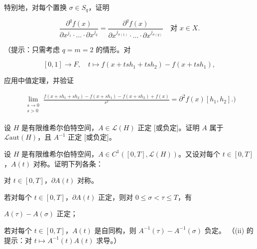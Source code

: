 \begin{exercises}
特别地，对每个置换 $ \sigma \in S_{q} $，证明

\[
\frac{\partial^{q}f(x)}{\partial x^{j_{1}} \cdot \ldots \cdot \partial x^{j_{q}}} = \frac{\partial^{q}f(x)}{\partial x^{j_{\sigma(1)}} \cdot \ldots \cdot \partial x^{j_{\sigma(q)}}} \quad \text{对 } x \in X .
\]

（提示：只需考虑 $ q = m = 2 $ 的情形。对

\[
[0, 1] \to F , \quad t \mapsto f(x + tsh_{1} + tsh_{2}) - f(x + tsh_{1}) ,
\]

应用中值定理，并验证

\begin{equation*}
\begin{aligned}
\lim_{\substack{s \to 0 \\ s > 0}}\frac{f(x + sh_{1} + sh_{2}) - f(x + sh_{1}) - f(x + sh_{2}) + f(x)}{s^{2}} = \partial^{2}f(x)[h_{1}, h_{2}] .)
\end{aligned}
\end{equation*}
\item

设 $ H $ 是有限维希尔伯特空间，$ A \in \mathcal{L}(H) $ 正定 [或负定]。证明 $ A $ 属于 $ \mathcal{L}\mathrm{aut}(H) $，且 $ A^{-1} $ 正定 [或负定]。

\item

设 $ H $ 是有限维希尔伯特空间，$ A \in C^{1}([0, T], \mathcal{L}(H)) $。又设对每个 $ t \in [0, T] $，$ A(t) $ 对称。证明下列各条：

\begin{items}
\item

对 $ t \in [0, T] $，$ \partial A(t) $ 对称。

\item

若对每个 $ t \in [0, T] $，$ \partial A(t) $ 正定，则对 $ 0 \le \sigma < \tau \le T $，有

\end{items}

\begin{subitems}
\item

$ A(\tau) - A(\sigma) $ 正定；

\item

若对每个 $ t \in [0, T] $，$ A(t) $ 是自同构，则 $ A^{-1}(\tau) - A^{-1}(\sigma) $ 负定。
（(ii) 的提示：对 $ t \mapsto A^{-1}(t)A(t) $ 求导。）

\end{subitems}


\end{exercises}
